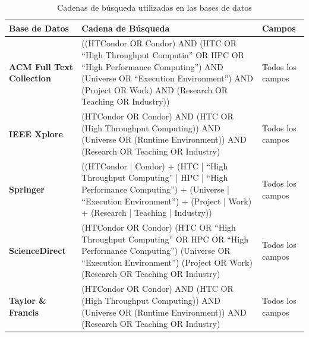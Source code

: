 \begin{table}[htbp]
	\centering
	\caption{Cadenas de búsqueda utilizadas en las bases de datos}
	\label{table:cadenas_de_busqueda}
	\renewcommand{\arraystretch}{1}  %
	\begin{tabular}{p{3.2cm}p{11cm}p{2.5cm}}
		\toprule
		\textbf{Base de Datos}            & \textbf{Cadena de Búsqueda}                                                                                                                                                                                        & \textbf{Campos}  \\
		\midrule
		\textbf{ACM Full Text Collection} & ((HTCondor OR Condor) AND (HTC OR ``High Throughput Computin'' OR HPC OR ``High Performance Computing'') AND (Universe OR ``Execution Environment'') AND (Project OR Work) AND (Research OR Teaching OR Industry)) & Todos los campos \\
		\addlinespace[0.8em]
		\textbf{IEEE Xplore}              & (HTCondor OR Condor) AND (HTC OR (High Throughput Computing)) AND (Universe OR (Runtime Environment)) AND (Research OR Teaching OR Industry)                                                                       & Todos los campos \\
		\addlinespace[0.8em]
		\textbf{Springer}                 & ((HTCondor | Condor) + (HTC | ``High Throughput Computing'' | HPC | ``High Performance Computing'') + (Universe | ``Execution Environment'') + (Project | Work) + (Research | Teaching | Industry))                & Todos los campos \\
		\addlinespace[0.8em]
		\textbf{ScienceDirect}            & (HTCondor OR Condor) (HTC OR ``High Throughput Computing'' OR HPC OR ``High Performance Computing'') (Universe OR ``Execution Environment'') (Project OR Work) (Research OR Teaching OR Industry)                  & Todos los campos \\
		\addlinespace[0.8em]
		\textbf{Taylor \& Francis}        & (HTCondor OR Condor) AND (HTC OR (High Throughput Computing)) AND (Universe OR (Runtime Environment)) AND (Research OR Teaching OR Industry)                                                                       & Todos los campos \\
		\bottomrule
	\end{tabular}
\end{table}


